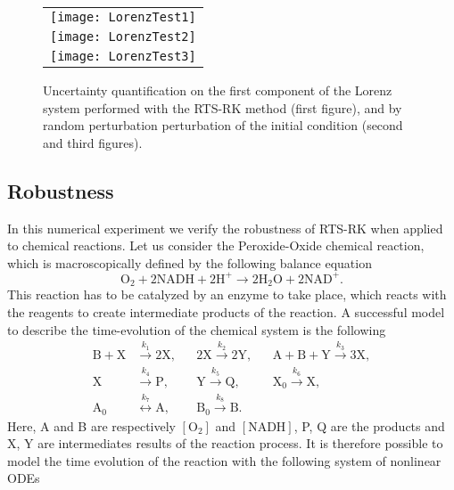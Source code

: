 \documentclass{siamart1116}
\numberwithin{theorem}{section}
\newcommand{\rightarrowtext}[1]{\ensuremath{\stackrel{#1}{\longrightarrow}}}
\newcommand{\leftrightarrowtext}[1]{\ensuremath{\stackrel{#1}{\longleftrightarrow}}}
\begin{document}
\begin{figure}
	\begin{center}
		\begin{tabular}{c}
			\texttt{[image: LorenzTest1]} \\
			\texttt{[image: LorenzTest2]} \\
 			\texttt{[image: LorenzTest3]}
		\end{tabular}
	\end{center}
	\caption{Uncertainty quantification on the first component of the Lorenz system performed with the RTS-RK method (first figure), and by random perturbation perturbation of the initial condition (second and third figures).}
	\label{fig:LorenzTest}
\end{figure}

\subsection{Robustness} In this numerical experiment we verify the robustness of RTS-RK when applied to chemical reactions. Let us consider the Peroxide-Oxide chemical reaction, which is macroscopically defined by the following balance equation
\begin{equation}
	\mathrm{O}_2 + 2\mathrm{NADH} + 2\mathrm{H}^+ \to 2\mathrm{H}_2\mathrm{O} + 2\mathrm{NAD}^+.
\end{equation}
This reaction has to be catalyzed by an enzyme to take place, which reacts with the reagents to create intermediate products of the reaction. A successful model \cite{Ols83} to describe the time-evolution of the chemical system is the following
\begin{equation}
\begin{aligned}
	\mathrm{B} + \mathrm{X} &\rightarrowtext{k_1} 2 \mathrm{X}, 
	&&2\mathrm{X} \rightarrowtext{k_2} 2\mathrm{Y}, 
	&&\mathrm{A} + \mathrm{B} + \mathrm{Y} \rightarrowtext{k_3} 3 \mathrm{X}, \\
	\mathrm{X} &\rightarrowtext{k_4} \mathrm{P}, 
	&&\mathrm{Y} \rightarrowtext{k_5} \mathrm{Q}, 
	&&\mathrm{X_0} \rightarrowtext{k_6} \mathrm{X}, \\
	\mathrm{A_0} &\leftrightarrowtext{k_7} \mathrm{A}, 
	&&\mathrm{B_0} \rightarrowtext{k_8} \mathrm{B}.
\end{aligned}
\end{equation}
Here, A and B are respectively $[\mathrm{O}_2]$ and $[\mathrm{NADH}]$, P, Q are the products and X, Y are intermediates results of the reaction process. It is therefore possible to model the time evolution of the reaction with the following system of nonlinear ODEs 
\end{document}
